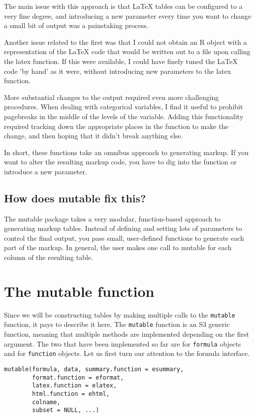 \documentclass{article}
\begin{document}
The main issue with this approach is that \LaTeX{} tables can be
configured to a very fine degree, and introducing a new parameter
every time you want to change a small bit of output was a painstaking
process.

Another issue related to the first was that I could not obtain an R
object with a representation of the LaTeX code that would be written
out to a file upon calling the latex function.  If this were available,
I could have finely tuned the LaTeX code 'by hand' as it were, without
introducing new parameters to the latex function. 

More substantial changes to the output required even more challenging
procedures.  When dealing with categorical variables, I find it useful
to prohibit pagebreaks in the middle of the levels of the variable.
Adding this functionality required tracking down the appropriate
places in the function to make the change, and then hoping that it
didn't break anything else.

In short, these functions take an omnibus approach to generating
markup.  If you want to alter the resulting markup code, you have to
dig into the function or introduce a new parameter.

\subsection{How does mutable fix this?}
The mutable package takes a very modular, function-based approach to
generating markup tables.  Instead of defining and setting lots of
parameters to control the final output, you pass small, user-defined
functions to generate each part of the markup. In general, the user
makes one call to mutable for each column of the resulting table.


\section{The mutable function} 

Since we will be constructing tables by making multiple calls to the
\texttt{mutable} function, it pays to describe it here.  The
\texttt{mutable} function is an S3 generic function, meaning that
multiple methods are implemented depending on the first argument.  The
two that have been implemented so far are for \texttt{formula} objects
and for \texttt{function} objects.  Let us first turn our attention to
the formula interface. 

\begin{verbatim}
mutable(formula, data, summary.function = esummary, 
        format.function = eformat, 
        latex.function = elatex, 
        html.function = ehtml, 
        colname, 
        subset = NULL, ...) 
\end{verbatim}
\end{document}
